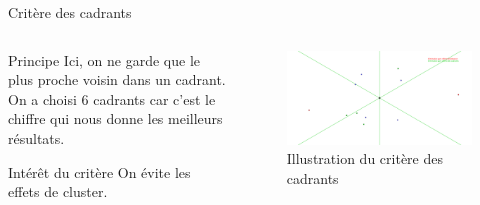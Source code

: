\begin{frame}{Critère des cadrants}
    \begin{columns}
        \begin{column}{0.4\paperwidth}
            \begin{block}{Principe}
                Ici, on ne garde que le plus proche voisin dans un cadrant. On a choisi 6 cadrants car c'est le chiffre qui nous donne les meilleurs résultats.
            \end{block}
            \begin{block}{Intérêt du critère}
                On évite les effets de cluster.
            \end{block}
        \end{column}
        \begin{column}{0.55\paperwidth}
            \begin{figure}
                \includegraphics[width=0.5\paperwidth]{images/criteria_illustrations/cadrants.png}
                \caption{\label{fig:cadrants_crit}Illustration du critère des cadrants}
            \end{figure}
        \end{column}
    \end{columns}
\end{frame}


